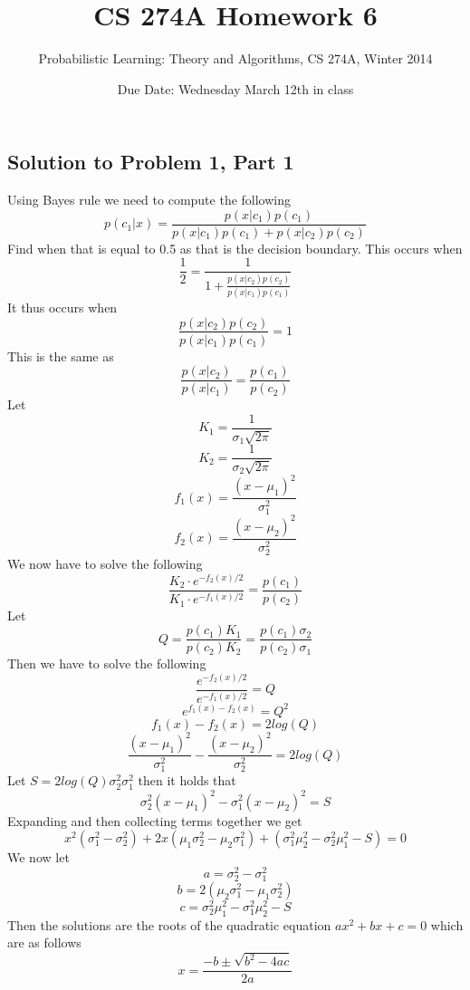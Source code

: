 \documentclass[11pt,psfig]{article}
\begin{document}
\setlength{\parskip}{1.2ex plus0.3ex minus 0.3ex}


\thispagestyle{empty} \pagestyle{myheadings} 



\title{CS 274A Homework 6}
\author{Probabilistic Learning: Theory and Algorithms, CS 274A, Winter 2014}
\date{Due Date: Wednesday March 12th in class}

\maketitle

\vfill\eject

\subsection*{Solution to Problem 1, Part 1}

Using Bayes rule we need to compute the following
\[
p(c_1|x) = \frac{p(x|c_1)p(c_1)}{p(x|c_1)p(c_1) + p(x|c_2)p(c_2)}
\]
Find when that is equal to 0.5 as that is the decision boundary. This occurs when
\[
\frac{1}{2} = \frac{1}{1 + \frac{p(x|c_2)p(c_2)}{p(x|c_1)p(c_1)}}
\]
It thus occurs when
\[
\frac{p(x|c_2)p(c_2)}{p(x|c_1)p(c_1)} = 1
\]
This is the same as
\[
\frac{p(x|c_2)}{p(x|c_1)} = \frac{p(c_1)}{p(c_2)}
\]
Let
\[
K_1 = \frac{1}{\sigma_1 \sqrt{2\pi}}
\]
\[
K_2 = \frac{1}{\sigma_2 \sqrt{2\pi}}
\]
\[
f_1(x) = \frac{(x-\mu_1)^2}{\sigma_1^2}
\]
\[
f_2(x) = \frac{(x-\mu_2)^2}{\sigma_2^2}
\]
We now have to solve the following
\[
\frac{K_2 \cdot e^{-f_2(x)/2}}{K_1 \cdot e^{-f_1(x)/2}} = \frac{p(c_1)}{p(c_2)}
\]
Let
\[
Q = \frac{p(c_1)K_1}{p(c_2)K_2} = \frac{p(c_1)\sigma_2}{p(c_2)\sigma_1}
\]
Then we have to solve the following
\[
\frac{e^{-f_2(x)/2}}{e^{-f_1(x)/2}} = Q
\]
\[
e^{f_1(x) - f_2(x)} = Q^2
\]
\[
f_1(x) - f_2(x) = 2 log(Q)
\]
\[
\frac{(x-\mu_1)^2}{\sigma_1^2} - \frac{(x-\mu_2)^2}{\sigma_2^2} = 2 log(Q)
\]
Let $S = 2 log(Q) \sigma_2^2 \sigma_1^2$ then it holds that
\[
\sigma_2^2(x-\mu_1)^2 - \sigma_1^2(x-\mu_2)^2 = S
\]
Expanding and then collecting terms together we get
\[
x^2(\sigma_1^2 - \sigma_2^2) + 2x(\mu_1 \sigma_2^2 - \mu_2 \sigma_1^2) + (\sigma_1^2 \mu_2^2 - \sigma_2^2 \mu_1^2 - S) = 0
\]
We now let
\[
a = \sigma_2^2 - \sigma_1^2
\]
\[
b = 2(\mu_2 \sigma_1^2 - \mu_1 \sigma_2^2)
\]
\[
c = \sigma_2^2 \mu_1^2 - \sigma_1^2 \mu_2^2 - S
\]
Then the solutions are the roots of the quadratic equation $ax^2 + bx + c = 0$ which are as follows
\[
x = \frac{-b \pm \sqrt{b^2 - 4ac}}{2a}
\]
\end{document}
